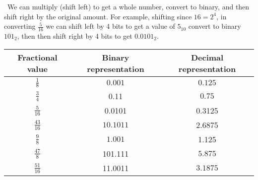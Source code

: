 \documentclass[12pt]{article}
\newenvironment{sol}[1][Solution]{\begin{trivlist}
		\item[\hskip \labelsep {\bfseries #1:}]}{\end{trivlist}}
\begin{document}
\begin{sol}
	\
	We can multiply (shift left) to
	get a whole number, convert to binary, and then shift right by the original
	amount. For example, shifting since $16=2^4$, in converting $\frac{5}{16}$
	we can shift left by 4 bits to get a value of $5_{10}$ convert to binary $101_2$,
	then then shift right by 4 bits to get $0.0101_2$.
	\begin{center}
		\def\arraystretch{1.25}%
		\begin{tabular}{ccc}
			Fractional value & Binary representation & Decimal representation \\
			\hline
			$\frac{1}{8}$ &  $0.001$ & $0.125$\\
			$\frac{3}{4}$ & 0.11& $0.75$\\
			$\frac{5}{16}$ & 0.0101 & 0.3125\\
			$\frac{43}{16}$ & $10.1011$ & 2.6875\\
			$\frac{9}{8}$ & $1.001$ & 1.125\\
			$\frac{47}{8}$ & 101.111 & $5.875$\\
			$\frac{51}{16}$ & 11.0011 & $3.1875$
		\end{tabular}
	\end{center}
\end{sol}
\end{document}
